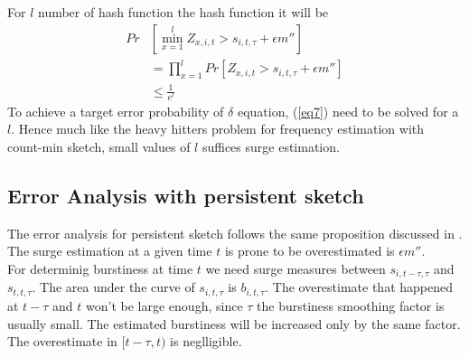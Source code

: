 For $l$ number of hash function the hash function it will be 
\begin{equation}
\begin{split}\label{eq7}
Pr &[ \min_{x=1}^{l} Z_{x,i,t} > s_{i,t,\tau} + \epsilon m''] \\
&= \prod_{x=1}^{l} Pr[ Z_{x,i,t} > s_{i,t,\tau} + \epsilon m''] \\
& \leq \frac{1}{e^l}
\end{split}
\end{equation}
To achieve a target error probability of $\delta$ equation, (\ref{eq7}) need to be solved for a $l$. Hence much like the heavy hitters problem for frequency estimation with count-min sketch, small values of $l$ suffices surge estimation.

\subsection{Error Analysis with persistent sketch}
The error analysis for persistent sketch follows the same proposition discussed in \cite{wei2015persistent}. The surge estimation at a given time $t$ is prone to be overestimated is $\epsilon m''$.  \\
For determinig burstiness at time $t$ we need surge measures between $s_{i,t-\tau,\tau}$ and $s_{t,t,\tau}$. The area under the curve of $s_{i,t,\tau}$ is $b_{i,t,\tau}$. The overestimate that happened at $t-\tau$ and $t$ won't be large enough, since $\tau$ the burstiness smoothing factor is usually small. The estimated burstiness will be increased only by the same factor. The overestimate in $[t-\tau,t) $ is neglligible. \\


